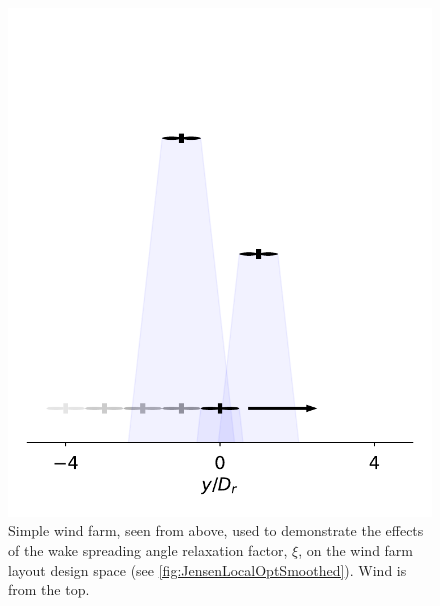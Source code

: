 \documentclass[a4paper]{jpconf}
\begin{document}
\begin{figure}[ht]
	\centering
	\begin{minipage}[t]{0.43\textwidth}
		\centering
		\includegraphics[width=\textwidth, trim={-0.5cm -0.5cm -0.5cm 3.25cm}, clip]{final_images/layouts/3turb-design-space}
		\caption{Simple wind farm, seen from above, used to demonstrate the effects of the wake spreading angle relaxation factor, $\xi$, on the wind farm layout design space (see \cref{fig:JensenLocalOptSmoothed}). Wind is from the top.}
		\label{fig:smoothing_locations_Jensen}
	\end{minipage}\hspace{1pc}
	\begin{minipage}[t]{0.52\textwidth}
		\centering

\end{minipage}
\end{figure}
\end{document}
